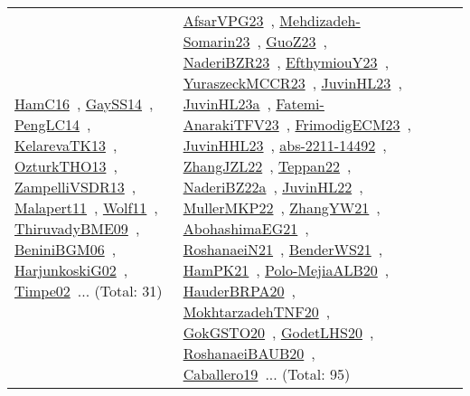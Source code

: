 {\begin{longtable}{lp{3cm}>{\raggedright\arraybackslash}p{6cm}>{\raggedright\arraybackslash}p{6cm}>{\raggedright\arraybackslash}p{8cm}}
\href{../works/HamC16.pdf}{HamC16}~\cite{HamC16}, \href{../works/GaySS14.pdf}{GaySS14}~\cite{GaySS14}, \href{../works/PengLC14.pdf}{PengLC14}~\cite{PengLC14}, \href{../works/KelarevaTK13.pdf}{KelarevaTK13}~\cite{KelarevaTK13}, \href{../works/OzturkTHO13.pdf}{OzturkTHO13}~\cite{OzturkTHO13}, \href{../works/ZampelliVSDR13.pdf}{ZampelliVSDR13}~\cite{ZampelliVSDR13}, \href{../works/Malapert11.pdf}{Malapert11}~\cite{Malapert11}, \href{../works/Wolf11.pdf}{Wolf11}~\cite{Wolf11}, \href{../works/ThiruvadyBME09.pdf}{ThiruvadyBME09}~\cite{ThiruvadyBME09}, \href{../works/BeniniBGM06.pdf}{BeniniBGM06}~\cite{BeniniBGM06}, \href{../works/HarjunkoskiG02.pdf}{HarjunkoskiG02}~\cite{HarjunkoskiG02}, \href{../works/Timpe02.pdf}{Timpe02}~\cite{Timpe02}... (Total: 31) & \href{../works/AfsarVPG23.pdf}{AfsarVPG23}~\cite{AfsarVPG23}, \href{../works/Mehdizadeh-Somarin23.pdf}{Mehdizadeh-Somarin23}~\cite{Mehdizadeh-Somarin23}, \href{../works/GuoZ23.pdf}{GuoZ23}~\cite{GuoZ23}, \href{../works/NaderiBZR23.pdf}{NaderiBZR23}~\cite{NaderiBZR23}, \href{../works/EfthymiouY23.pdf}{EfthymiouY23}~\cite{EfthymiouY23}, \href{../works/YuraszeckMCCR23.pdf}{YuraszeckMCCR23}~\cite{YuraszeckMCCR23}, \href{../works/JuvinHL23.pdf}{JuvinHL23}~\cite{JuvinHL23}, \href{../works/JuvinHL23a.pdf}{JuvinHL23a}~\cite{JuvinHL23a}, \href{../works/Fatemi-AnarakiTFV23.pdf}{Fatemi-AnarakiTFV23}~\cite{Fatemi-AnarakiTFV23}, \href{../works/FrimodigECM23.pdf}{FrimodigECM23}~\cite{FrimodigECM23}, \href{../works/JuvinHHL23.pdf}{JuvinHHL23}~\cite{JuvinHHL23}, \href{../works/abs-2211-14492.pdf}{abs-2211-14492}~\cite{abs-2211-14492}, \href{../works/ZhangJZL22.pdf}{ZhangJZL22}~\cite{ZhangJZL22}, \href{../works/Teppan22.pdf}{Teppan22}~\cite{Teppan22}, \href{../works/NaderiBZ22a.pdf}{NaderiBZ22a}~\cite{NaderiBZ22a}, \href{../works/JuvinHL22.pdf}{JuvinHL22}~\cite{JuvinHL22}, \href{../works/MullerMKP22.pdf}{MullerMKP22}~\cite{MullerMKP22}, \href{../works/ZhangYW21.pdf}{ZhangYW21}~\cite{ZhangYW21}, \href{../works/AbohashimaEG21.pdf}{AbohashimaEG21}~\cite{AbohashimaEG21}, \href{../works/RoshanaeiN21.pdf}{RoshanaeiN21}~\cite{RoshanaeiN21}, \href{../works/BenderWS21.pdf}{BenderWS21}~\cite{BenderWS21}, \href{../works/HamPK21.pdf}{HamPK21}~\cite{HamPK21}, \href{../works/Polo-MejiaALB20.pdf}{Polo-MejiaALB20}~\cite{Polo-MejiaALB20}, \href{../works/HauderBRPA20.pdf}{HauderBRPA20}~\cite{HauderBRPA20}, \href{../works/MokhtarzadehTNF20.pdf}{MokhtarzadehTNF20}~\cite{MokhtarzadehTNF20}, \href{../works/GokGSTO20.pdf}{GokGSTO20}~\cite{GokGSTO20}, \href{../works/GodetLHS20.pdf}{GodetLHS20}~\cite{GodetLHS20}, \href{../works/RoshanaeiBAUB20.pdf}{RoshanaeiBAUB20}~\cite{RoshanaeiBAUB20}, \href{../works/Caballero19.pdf}{Caballero19}~\cite{Caballero19}... (Total: 95)\\

\end{longtable}}
